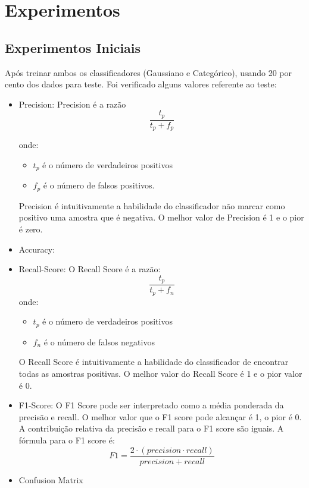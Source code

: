 \documentclass[conference]{IEEEtran}
\begin{document}
\section{Experimentos}

\subsection{Experimentos Iniciais}
Após treinar ambos os classificadores (Gaussiano e Categórico), usando 20 por cento dos dados para teste. Foi verificado alguns valores referente ao teste:

\begin{itemize}
\item Precision: Precision é a razão
    \begin{equation}
        \frac{t_p}{t_p + f_p}
    \end{equation}

    onde:

    \begin{itemize}
    \item $t_p$ é o número de verdadeiros positivos
    \item $f_p$ é o número de falsos positivos.
    \end{itemize}

    Precision é intuitivamente a habilidade do classificador não marcar como positivo uma amostra que é negativa. O melhor valor de Precision é 1 e o pior é zero.
    \cite{b7}
\item Accuracy:
\item Recall-Score: O Recall Score é a razão:
    \begin{equation}
        \frac{t_p}{t_p + f_n}
    \end{equation}
    onde:
    \begin{itemize}
    \item $t_p$ é o número de verdadeiros positivos
    \item $f_n$ é o número de falsos negativos
    \end{itemize}
    O Recall Score é intuitivamente a habilidade do classificador de encontrar todas as amostras positivas. O melhor valor do Recall Score é 1 e o pior valor é 0.
    \cite{b6}
\item F1-Score: O F1 Score pode ser interpretado como a média ponderada da precisão e recall. O melhor valor que o  F1 score pode alcançar é 1, o pior é 0. A contribuição relativa da precisão e recall para o F1 score são iguais. A fórmula para o F1 score é:
\begin{equation}
    F1 = \frac{2\cdot(precision\cdot recall)}{precision + recall}
\end{equation}
\cite{b2}
\item Confusion Matrix
\end{itemize}
\end{document}

